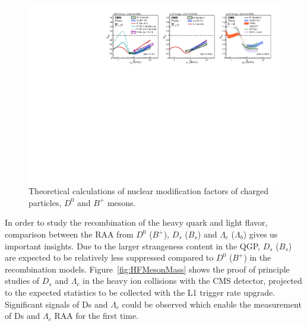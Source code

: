 \begin{figure}[!ht]
\begin{center}
\includegraphics[width=.90\textwidth]{figures/cTheoryRAA_BD_v1.pdf}
\caption{Theoretical calculations of nuclear modification factors of charged particles, $D^0$ and $B^+$ mesons.}
\label{fig:RAA_theory}
\end{center}
\end{figure}

In order to study the recombination of the heavy quark and light flavor, comparison between the RAA from $D^0$ ($B^+$), $D_s$ ($B_s$) and $\Lambda_c$ ($\Lambda_b$) gives us important insights. Due to the larger strangeness content in the QGP, $D_s$ ($B_s$) are expected to be relatively less suppressed compared to $D^0$ ($B^+$) in the recombination models. Figure~\ref{fig:HFMesonMass} shows the proof of principle studies of $D_s$ and $\Lambda_c$ in the heavy ion collisions with the CMS detector, projected to the expected statistics to be collected with the L1 trigger rate upgrade. Significant signals of Ds and $\Lambda_c$ could be observed which enable the measurement of Ds and $\Lambda_c$ RAA for the first time. 



